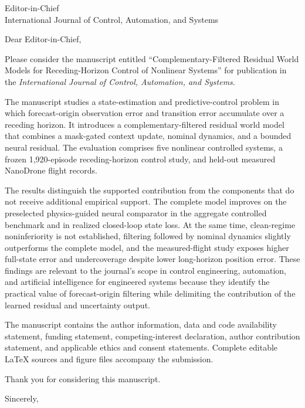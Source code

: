\documentclass[11pt]{letter}
\date{10 November 2026}
\begin{document}
\begin{letter}{Editor-in-Chief\\
International Journal of Control, Automation, and Systems}
\opening{Dear Editor-in-Chief,}

Please consider the manuscript entitled ``Complementary-Filtered Residual
World Models for Receding-Horizon Control of Nonlinear Systems'' for
publication in the \emph{International Journal of Control, Automation, and
Systems}.

The manuscript studies a state-estimation and predictive-control problem in
which forecast-origin observation error and transition error accumulate over a
receding horizon. It introduces a complementary-filtered residual world model
that combines a mask-gated context update, nominal dynamics, and a bounded
neural residual. The evaluation comprises five nonlinear controlled systems,
a frozen 1,920-episode receding-horizon control study, and held-out measured
NanoDrone flight records.

The results distinguish the supported contribution from the components that
do not receive additional empirical support. The complete model improves on
the preselected physics-guided neural comparator in the aggregate controlled
benchmark and in realized closed-loop state loss. At the same time,
clean-regime noninferiority is not established, filtering followed by nominal
dynamics slightly outperforms the complete model, and the measured-flight
study exposes higher full-state error and undercoverage despite lower
long-horizon position error. These findings are relevant to the journal's
scope in control engineering, automation, and artificial intelligence for
engineered systems because they identify the practical value of
forecast-origin filtering while delimiting the contribution of the learned
residual and uncertainty output.

The manuscript contains the author information, data and code availability
statement, funding statement, competing-interest declaration, author
contribution statement, and applicable ethics and consent statements. Complete
editable LaTeX sources and figure files accompany the submission.

Thank you for considering this manuscript.

\closing{Sincerely,}
\end{letter}
\end{document}
